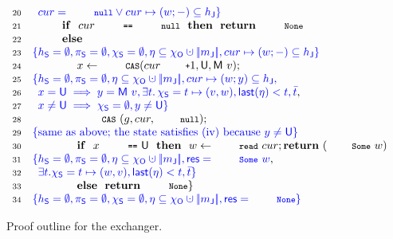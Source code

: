 {\begin{figure}
\[{{\begin{array}{rl}
\Num{20} & \specK{\hphantom{\}}cur = \esc{null} \vee cur \mapsto (w; -) \subseteq \heapj\}}\\
\Num{21} & ~~~~ ~~~~ \kw{if}~~cur~\esc{==}~\esc{null}~~\kw{then}~~\kw{return}~{\esc{None}}\\
\Num{22} & ~~~~ ~~~~ \kw{else}\\
\Num{23} & \specK{\{\heaps = \emptyset, \perms = \emptyset, \hists = \emptyset, \gist \subseteq \histo \hunion \mygather{\pending}, cur \mapsto (w; -) \subseteq \heapj\}}\\
\Num{24} & ~~~~ ~~~~ ~~~~ x \Asgn \esc{CAS}(cur\esc{+}1, \Unmatched, \Matched v);\\
\Num{25} & \specK{\{\heaps = \emptyset, \perms = \emptyset, \gist \subseteq \histo \hunion \mygather{\pending}, cur \mapsto (w; y) \subseteq \heapj,} \\
\Num{26} & \specK{\hphantom{\}}x = \Unmatched \implies y = \Matched v, \exists t\ldot \hists = t \mapsto (v, w), \mathsf{last}(\gist) < t, \twin t},\\
\Num{27} & \specK{\hphantom{\}}x \neq \Unmatched \implies \hists = \emptyset, y \neq \Unmatched \}}\\
\Num{28} & ~~~~ ~~~~ ~~~~ \esc{CAS}~(g, cur, \esc{null});\\
\Num{29} & \specK{\{\mbox{same as above; the state satisfies (iv) because $y \neq \Unmatched$}\}}\\
\Num{30} & ~~~~ ~~~~ ~~~~ \kw{if}~~x~\esc{==}~\Unmatched~~\kw{then}~~w\Asgn \esc{read}~cur;\kw{return}~(\esc{Some}\ w)\\
\Num{31} & \specK{\{ \heaps = \emptyset, \perms = \emptyset, \gist \subseteq \histo \hunion \mygather{\pending}, \res=\esc{Some}\ w}, \\
\Num{32} & \specK{\hphantom{\}}\exists t. \hists = t \mapsto (w, v), \mathsf{last}(\gist) < t, \twin t\}}\\
\Num{33} & ~~~~ ~~~~ ~~~~ \kw{else}~~\kw{return}~\esc{None}\}\\
\Num{34} & \specK{\{\heaps = \emptyset, \perms = \emptyset, \hists = \emptyset, \gist \subseteq \histo \hunion \mygather{\pending}, \res=\esc{None}\}} 
\end{array}
}}
\]
\caption{Proof outline for the exchanger.}
\label{fig:exchanger_proof}
\end{figure} 
}
